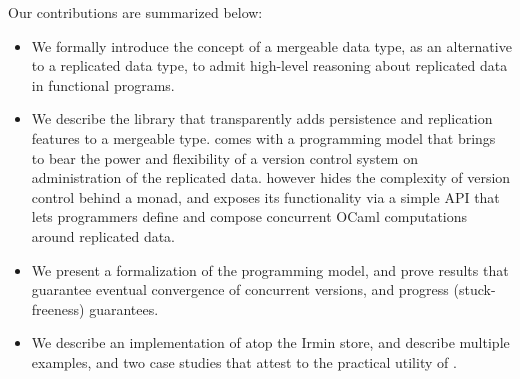 \begin{itemize}
  Our contributions are summarized below:
  \begin{itemize}
    \item We formally introduce the concept of a mergeable data type,
    as an alternative to a replicated data type, to admit high-level
    reasoning about replicated data in functional programs.

    \item We describe the \name library that transparently adds
    persistence and replication features to a mergeable type. \name
    comes with a programming model that brings to bear the power and
    flexibility of a version control system on administration of the
    replicated data. \name however hides the complexity of version
    control behind a monad, and exposes its functionality via a simple
    API that lets programmers define and compose concurrent OCaml
    computations around replicated data. 

    \item We present a formalization of the \name programming model,
    and prove results that guarantee eventual convergence of
    concurrent versions, and progress (stuck-freeness) guarantees.

    \item We describe an implementation of \name atop the Irmin store,
    and describe multiple examples, and two case studies that
    attest to the practical utility of \name.
  \end{itemize}

\end{itemize}
